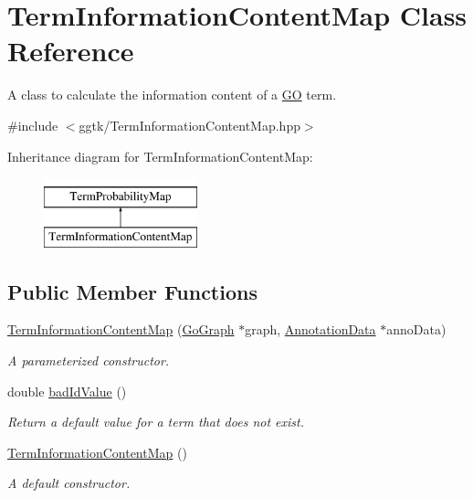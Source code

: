 \hypertarget{classTermInformationContentMap}{}\section{Term\+Information\+Content\+Map Class Reference}
\label{classTermInformationContentMap}


A class to calculate the information content of a \hyperlink{namespaceGO}{GO} term.  




{\ttfamily \#include $<$ggtk/\+Term\+Information\+Content\+Map.\+hpp$>$}

Inheritance diagram for Term\+Information\+Content\+Map\+:\begin{figure}[H]
\begin{center}
\leavevmode
\includegraphics[height=2.000000cm]{classTermInformationContentMap}
\end{center}
\end{figure}
\subsection*{Public Member Functions}
\begin{DoxyCompactItemize}
\item 
\hyperlink{classTermInformationContentMap_ae58d9e3773eff919841e2de522ececd1}{Term\+Information\+Content\+Map} (\hyperlink{classGoGraph}{Go\+Graph} $\ast$graph, \hyperlink{classAnnotationData}{Annotation\+Data} $\ast$anno\+Data)
\begin{DoxyCompactList}\small\item\em A parameterized constructor. \end{DoxyCompactList}\item 
double \hyperlink{classTermInformationContentMap_a082c021a27478403aad9bb99c0e975e6}{bad\+Id\+Value} ()
\begin{DoxyCompactList}\small\item\em Return a default value for a term that does not exist. \end{DoxyCompactList}\item 
\hyperlink{classTermInformationContentMap_a86494db712efa761fb671d51a6902c25}{Term\+Information\+Content\+Map} ()
\begin{DoxyCompactList}\small\item\em A default constructor. \end{DoxyCompactList}\end{DoxyCompactItemize}
